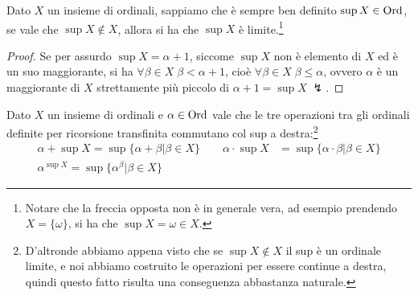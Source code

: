 \begin{remark}
	Dato $X$ un insieme di ordinali, sappiamo che è sempre ben definito $\sup X \in \operatorname{Ord}$, se vale che $\sup X \not \in X$, allora  si ha che $\sup X$ è limite.\footnote{Notare che la freccia opposta
	non è in generale vera, ad esempio prendendo $X = \{\omega\}$, si ha che $\sup X = \omega \in X$.}
\end{remark}

\begin{proof}
	Se per assurdo $\sup X = \alpha + 1$, siccome $\sup X$ non è elemento di $X$ ed è un suo maggiorante, si ha $\forall \beta \in X \; \beta < \alpha + 1$,
	cioè $\forall \beta \in X \; \beta \leq \alpha$, ovvero $\alpha$ è un maggiorante di $X$ strettamente più piccolo di $\alpha + 1 = \sup X \; \lightning$.
\end{proof}

\begin{remark}
	Dato $X$ un insieme di ordinali e $\alpha \in \operatorname{Ord}$ vale che le tre operazioni tra gli ordinali definite per ricorsione transfinita
	commutano col sup a destra:\footnote{D'altronde abbiamo appena visto che se $\sup X \not \in X$ il sup è un ordinale limite, e noi abbiamo costruito le operazioni per essere continue a destra, quindi questo fatto risulta una conseguenza abbastanza naturale.}
	\begin{align*}
		\alpha + \sup X = \sup\{\alpha + \beta | \beta \in X\} \qquad \alpha \cdot \sup X &= \sup \{\alpha \cdot \beta | \beta \in X\} \\
		\alpha^{\sup X} = \sup\{\alpha^\beta | \beta \in X\}
	\end{align*}
\end{remark}

